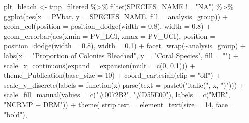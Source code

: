 \documentclass[
]{article}
\newenvironment{Shaded}{\begin{snugshade}}{\end{snugshade}}
\newcommand{\AttributeTok}[1]{\textcolor[rgb]{0.40,0.45,0.13}{#1}}
\newcommand{\ControlFlowTok}[1]{\textcolor[rgb]{0.00,0.23,0.31}{#1}}
\newcommand{\DecValTok}[1]{\textcolor[rgb]{0.68,0.00,0.00}{#1}}
\newcommand{\FloatTok}[1]{\textcolor[rgb]{0.68,0.00,0.00}{#1}}
\newcommand{\FunctionTok}[1]{\textcolor[rgb]{0.28,0.35,0.67}{#1}}
\newcommand{\NormalTok}[1]{\textcolor[rgb]{0.00,0.23,0.31}{#1}}
\newcommand{\OtherTok}[1]{\textcolor[rgb]{0.00,0.23,0.31}{#1}}
\newcommand{\SpecialCharTok}[1]{\textcolor[rgb]{0.37,0.37,0.37}{#1}}
\newcommand{\StringTok}[1]{\textcolor[rgb]{0.13,0.47,0.30}{#1}}
\begin{document}
\begin{Shaded}
\begin{Highlighting}[]
\NormalTok{plt\_bleach }\OtherTok{\textless{}{-}}\NormalTok{ tmp\_filtered }\SpecialCharTok{\%\textgreater{}\%}
  \FunctionTok{filter}\NormalTok{(SPECIES\_NAME }\SpecialCharTok{!=} \StringTok{"NA"}\NormalTok{) }\SpecialCharTok{\%\textgreater{}\%}
  \FunctionTok{ggplot}\NormalTok{(}\FunctionTok{aes}\NormalTok{(}\AttributeTok{x =}\NormalTok{ PVbar, }\AttributeTok{y =}\NormalTok{ SPECIES\_NAME, }\AttributeTok{fill =}\NormalTok{ analysis\_group)) }\SpecialCharTok{+}
  \FunctionTok{geom\_col}\NormalTok{(}\AttributeTok{position =} \FunctionTok{position\_dodge}\NormalTok{(}\AttributeTok{width =} \FloatTok{0.8}\NormalTok{), }\AttributeTok{width =} \FloatTok{0.8}\NormalTok{) }\SpecialCharTok{+}
  \FunctionTok{geom\_errorbar}\NormalTok{(}\FunctionTok{aes}\NormalTok{(}\AttributeTok{xmin =}\NormalTok{ PV\_LCI, }\AttributeTok{xmax =}\NormalTok{ PV\_UCI),}
                \AttributeTok{position =} \FunctionTok{position\_dodge}\NormalTok{(}\AttributeTok{width =} \FloatTok{0.8}\NormalTok{), }\AttributeTok{width =} \FloatTok{0.1}\NormalTok{) }\SpecialCharTok{+}
  \FunctionTok{facet\_wrap}\NormalTok{(}\SpecialCharTok{\textasciitilde{}}\NormalTok{analysis\_group) }\SpecialCharTok{+}
    \FunctionTok{labs}\NormalTok{(}\AttributeTok{x =} \StringTok{"Proportion of Colonies Bleached"}\NormalTok{, }\AttributeTok{y =} \StringTok{"Coral Species"}\NormalTok{, }\AttributeTok{fill =} \StringTok{""}\NormalTok{) }\SpecialCharTok{+}
    \FunctionTok{scale\_x\_continuous}\NormalTok{(}\AttributeTok{expand =} \FunctionTok{expansion}\NormalTok{(}\AttributeTok{mult =} \FunctionTok{c}\NormalTok{(}\DecValTok{0}\NormalTok{, }\FloatTok{0.1}\NormalTok{))) }\SpecialCharTok{+}
        \FunctionTok{theme\_Publication}\NormalTok{(}\AttributeTok{base\_size =} \DecValTok{10}\NormalTok{) }\SpecialCharTok{+}
    \FunctionTok{coord\_cartesian}\NormalTok{(}\AttributeTok{clip =} \StringTok{"off"}\NormalTok{) }\SpecialCharTok{+}
        \FunctionTok{scale\_y\_discrete}\NormalTok{(}\AttributeTok{labels =} \ControlFlowTok{function}\NormalTok{(x) }\FunctionTok{parse}\NormalTok{(}\AttributeTok{text =} \FunctionTok{paste0}\NormalTok{(}\StringTok{"italic(\textquotesingle{}"}\NormalTok{, x, }\StringTok{"\textquotesingle{})"}\NormalTok{))) }\SpecialCharTok{+}
   \FunctionTok{scale\_fill\_manual}\NormalTok{(}\AttributeTok{values =} \FunctionTok{c}\NormalTok{(}\StringTok{"\#0072B2"}\NormalTok{, }\StringTok{"\#D55E00"}\NormalTok{), }\AttributeTok{labels =} \FunctionTok{c}\NormalTok{(}\StringTok{"MIR"}\NormalTok{, }\StringTok{"NCRMP + DRM"}\NormalTok{)) }\SpecialCharTok{+}
    \FunctionTok{theme}\NormalTok{(}
          \AttributeTok{strip.text =} \FunctionTok{element\_text}\NormalTok{(}\AttributeTok{size =} \DecValTok{14}\NormalTok{, }\AttributeTok{face =} \StringTok{"bold"}\NormalTok{),}

\end{Highlighting}
\end{Shaded}
\end{document}
